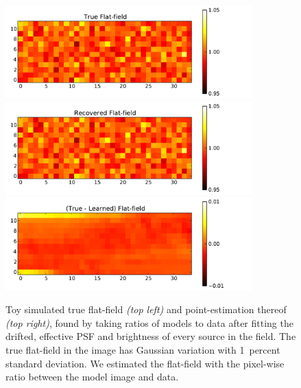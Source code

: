 \documentclass[letterpaper,12pt,whitepaper]{haastex}
\begin{document}
\begin{figure}
\includegraphics[width=0.85\textwidth]{sim2-205}
\includegraphics[width=0.85\textwidth]{sim2-206}
\includegraphics[width=0.85\textwidth]{sim2-207}
\caption{Toy simulated true flat-field \textsl{(top left)} and point-estimation thereof \textsl{(top right)},
  found by taking ratios of models to data after fitting the drifted, effective PSF and brightness of every source in the field.
  The true flat-field in the image has Gaussian variation with 1~percent standard deviation.
  We estimated the flat-field with the pixel-wise ratio between the model image and data.\label{fig:toyflat}}
\end{figure}
\end{document}
